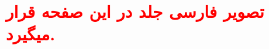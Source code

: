 \BNazF
\section*{\textcolor{red}{\textbf{تصویر فارسی جلد در این صفحه قرار میگیرد.}}}
\thispagestyle{empty}
